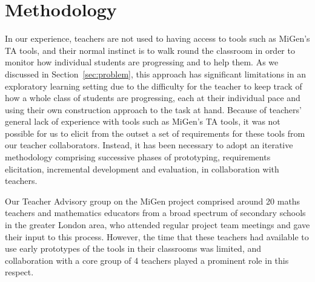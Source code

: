 \section{Methodology}
\label{sec:methodology}

In our experience, teachers are not used to having access to tools
such as MiGen's TA tools, and their normal instinct is to walk
round the classroom in order to monitor how individual 
students are progressing and to help them.  
As we discussed in Section~\ref{sec:problem},
this approach has significant limitations in an exploratory learning setting
due to the difficulty for the teacher 
to keep track of how a whole class of students are progressing, 
each at their individual pace and using their own
construction approach to the task at hand. Because of teachers'
general lack of experience with tools such as MiGen's TA tools, 
it was not possible for us to elicit from the outset a set of requirements 
for these tools from our teacher collaborators. Instead, it has been
necessary to adopt an iterative methodology comprising
successive phases of prototyping, requirements elicitation,
incremental development and evaluation, in collaboration with teachers. 



Our Teacher Advisory group on the MiGen project comprised around 
20 maths teachers and mathematics educators
from a broad spectrum of secondary schools in the greater London area,
who attended regular project team meetings and gave their input to this 
process. However, the time that these teachers had
available to use early prototypes of the tools in their classrooms was
limited, and collaboration with a core group of 4 teachers
played a prominent role in this respect. 
 
